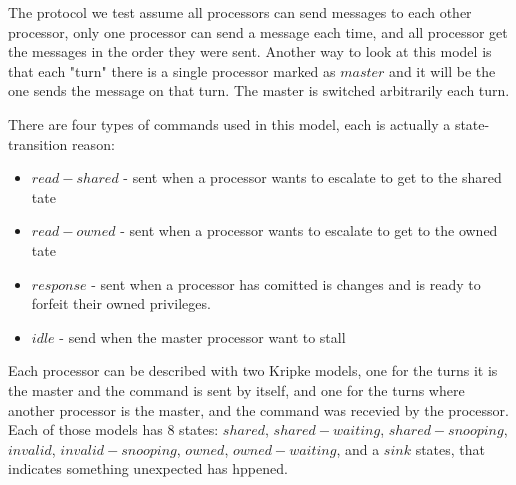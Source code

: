 \documentclass[11pt]{article}
\begin{document}
        The protocol we test assume all processors can send messages to each other processor, only one
        processor can send a message each time, and all processor get the messages in the order they were sent.
        Another way to look at this model is that each "turn" there is a single processor marked as $master$ 
        and it will be the one sends the message on that turn. The master is switched arbitrarily each turn.

        There are four types of commands used in this model, each is actually a state-transition reason:
        \begin{itemize}
            \item
                $read-shared$ - sent when a processor wants to escalate to get to the shared tate
            \item
                $read-owned$ - sent when a processor wants to escalate to get to the owned tate
            \item
                $response$ - sent when a processor has comitted is changes and is ready to forfeit
                their owned privileges.
            \item 
                $idle$ - send when the master processor want to stall
        \end{itemize}

        Each processor can be described with two Kripke models, one for the turns it 
        is the master and the command is sent by itself, and one for the turns where another 
        processor is the master, and the command was recevied by the processor.
        Each of those models has 8 states: $shared$, $shared-waiting$, $shared-snooping$,
        $invalid$, $invalid-snooping$, $owned$, $owned-waiting$, and a $sink$ states, that indicates something 
        unexpected has hppened. 
\end{document}
